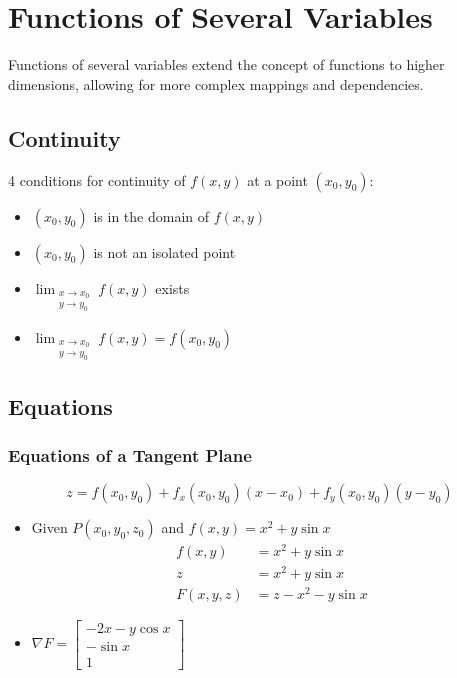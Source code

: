 \chapter{Functions of Several Variables}
Functions of several variables extend the concept of functions to higher dimensions, allowing for more complex mappings and dependencies.

\section{Continuity}

4 conditions for continuity of $f(x, y)$ at a point $(x_0, y_0)$:

\begin{itemize}
    \item $(x_0, y_0)$ is in the domain of $f(x, y)$
    \item $(x_0, y_0)$ is not an isolated point
    \item $\lim_{\substack{x \to x_0\\y \to y_0}} f(x, y)$ exists
    \item $\lim_{\substack{x \to x_0\\y \to y_0}} f(x, y) = f(x_0, y_0)$
\end{itemize}

\section{Equations}

\subsection{Equations of a Tangent Plane}
\begin{equation} \label{Tangent Plane}
    z = f(x_0, y_0) + f_x(x_0, y_0)(x - x_0) + f_y(x_0, y_0)(y - y_0)
\end{equation}
\begin{itemize}
    \item Given $P(x_0, y_0, z_0)$ and $f(x, y) = x^2 + y\sin x$
    \begin{align*}
        f(x,y) &= x^2 + y\sin x \\
        z &= x^2 + y\sin x \\
        F(x, y, z) &= z - x^2 - y\sin x
    \end{align*}
    \item $\nabla F = 
    \begin{bmatrix} 
    -2x - y\cos x \\ 
    -\sin x \\ 1 
    \end{bmatrix}$
\end{itemize}

